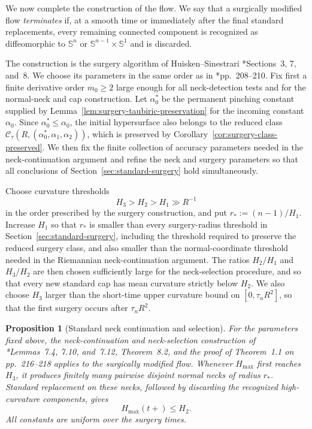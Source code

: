 \documentclass[11pt,reqno]{amsart}
\newtheorem{proposition}{Proposition}[section]
\theoremstyle{definition}
\theoremstyle{remark}
\numberwithin{equation}{section}
\newcommand{\Sph}{\mathbb S}
\newcommand{\CC}{\mathcal C}
\begin{document}
We now complete the construction of the flow.  We say that a surgically
modified flow \emph{terminates} if, at a smooth time or immediately after
the final standard replacements, every remaining connected component is
recognized as diffeomorphic to $\Sph^n$ or
$\Sph^{n-1}\times\Sph^1$ and is discarded.

The construction is the surgery algorithm of Huisken--Sinestrari
\cite{HS09}*{Sections~3, 7, and~8}.  We choose its parameters in the same
order as in \cite{HS09}*{pp.~208--210}.  Fix first a finite derivative order
$m_0\geq2$ large enough for all neck-detection tests and for the normal-neck
and cap construction.  Let
$\alpha_0^*$ be the permanent pinching constant supplied by
Lemma~\ref{lem:surgery-taubiric-preservation} for the incoming constant
$\alpha_0$.
Since $\alpha_0^*\leq\alpha_0$, the initial hypersurface also belongs to the
reduced class $\CC_\tau(R,(\alpha_0^*,\alpha_1,\alpha_2))$, which is preserved by
Corollary~\ref{cor:surgery-class-preserved}.  We then fix the finite
collection of accuracy parameters needed in the neck-continuation argument
and refine the neck and surgery parameters so that all conclusions of
Section~\ref{sec:standard-surgery} hold simultaneously.

Choose curvature thresholds
\begin{equation*}
H_3>H_2>H_1\gg R^{-1}
\end{equation*}
in the order prescribed by the surgery construction, and put $r_*:={(n-1)}/{H_1}$. 
Increase $H_1$ so that $r_*$ is smaller than every surgery-radius
threshold in Section~\ref{sec:standard-surgery}, including the
threshold required to preserve the reduced surgery class, and also
smaller than the normal-coordinate threshold needed in the Riemannian
neck-continuation argument.  The
ratios $H_2/H_1$ and $H_3/H_2$ are then chosen sufficiently large for the
neck-selection procedure, and so that every new standard cap has mean
curvature strictly below $H_2$.  We also choose $H_3$ larger than the
short-time upper curvature bound on $[0,\tau_nR^2]$, so that the first
surgery occurs after $\tau_nR^2$.

\begin{proposition}[Standard neck continuation and selection]
\label{prop:standard-neck-continuation}
For the parameters fixed above, the neck-continuation and neck-selection
construction of \cite{HS09}*{Lemmas~7.4, 7.10, and~7.12,
Theorem~8.2, and the proof of Theorem~1.1 on pp.~216--218} applies to the
surgically modified flow.  Whenever $H_{\max}$ first reaches $H_3$, it produces
finitely many pairwise disjoint normal necks of radius $r_*$.  Standard
replacement on these necks, followed by discarding the recognized
high-curvature components, gives
\begin{equation}\label{eq:Hmax-after-surgery}
  H_{\max}(t+)\leq H_2.
\end{equation}
All constants are uniform over the surgery times.
\end{proposition}
\end{document}
